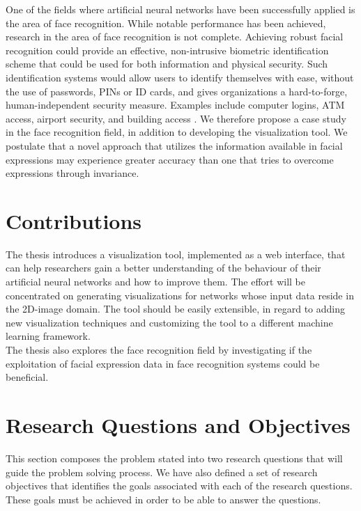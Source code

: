 \noindent One of the fields where artificial neural networks have been successfully applied is the area of face recognition. While notable performance has been achieved, research in the area of face recognition is not complete. Achieving robust facial recognition could provide an effective, non-intrusive biometric identification scheme that could be used for both information and physical security. Such identification systems would allow users to identify themselves with ease, without the use of passwords, PINs or ID cards, and gives organizations a hard-to-forge, human-independent security measure. Examples include computer logins, ATM access, airport security, and building access \cite{application_1, application_2, application_3}. We therefore propose a case study in the face recognition field, in addition to developing the visualization tool. We postulate that a novel approach that utilizes the information available in facial expressions may experience greater accuracy than one that tries to overcome expressions through invariance. \\


\section{Contributions}

The thesis introduces a visualization tool, implemented as a web interface, that can help researchers gain a better understanding of the behaviour of their artificial neural networks and how to improve them. The effort will be concentrated on generating visualizations for networks whose input data reside in the 2D-image domain. The tool should be easily extensible, in regard to adding new visualization techniques and customizing the tool to a different machine learning framework. \\

\noindent The thesis also explores the face recognition field by investigating if the exploitation of facial expression data in face recognition systems could be beneficial.

\section{Research Questions and Objectives}

This section composes the problem stated into two research questions that will guide the problem solving process. We have also defined a set of research objectives that identifies the goals associated with each of the research questions. These goals must be achieved in order to be able to answer the questions.

